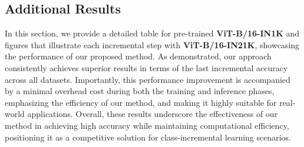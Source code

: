 \subsection{Additional Results}
\label{Additional Results}
In this section, we provide a detailed table for pre-trained \textbf{ViT-B/16-IN1K} and figures that illustrate each incremental step with  \textbf{ViT-B/16-IN21K}, showcasing the performance of our proposed method. As demonstrated, our approach consistently achieves superior results in terms of the last incremental accuracy across all datasets. Importantly, this performance improvement is accompanied by a minimal overhead cost during both the training and inference phases, emphasizing the efficiency of our method, and making it highly suitable for real-world applications. Overall, these results underscore the effectiveness of our method in achieving high accuracy while maintaining computational efficiency, positioning it as a competitive solution for class-incremental learning scenarios.

